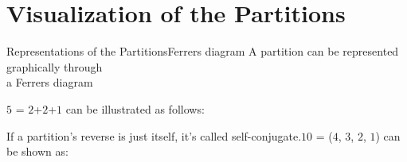 \documentclass{beamer}
\begin{document}
    \section{Visualization of the Partitions}
    \begin{frame}{Representations of the Partitions}{Ferrers diagram}
        \centering
        A partition can be represented graphically through \\ a Ferrers diagram
        \vspace{2em}
    
        \begin{minipage}[t]{0.48\textwidth}
            \centering
           {\tiny {$5$ = $2$+$2$+$1$ can be illustrated as follows:}}
        \end{minipage}\hfill
        \begin{minipage}[t]{0.48\textwidth}
            \centering
            {\tiny{If a partition's reverse is just itself, it's called self-conjugate.$10$ = ($4$, $3$, $2$, $1$) can be shown as: }}
                \vspace{2em}
        \end{minipage}
    \end{frame}
    
\end{document}
